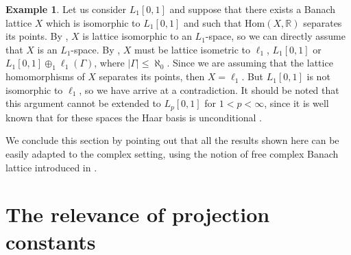 \documentclass[11pt]{amsart}
\theoremstyle{definition}
\newtheorem{example}[thm]{Example}
\numberwithin{equation}{section}
\begin{document}
\begin{example}
 Let us consider $L_1[0,1]$ and suppose that there exists a Banach lattice $X$ which is isomorphic to $L_1[0,1]$ and such that $\text{Hom}(X,\mathbb{R})$ separates its points. By \cite[Proposition 2.1]{dHMST23}, $X$ is lattice isomorphic to an $L_1$-space, so we can directly assume that $X$ is an $L_1$-space. By \cite[Corollary to Theorem 9, Section 14]{Lacey-book}, $X$ must be lattice isometric to $\ell_1$, $L_1[0,1]$ or $L_1[0,1]\oplus_1\ell_1(\Gamma)$, where $|\Gamma|\leq\aleph_0$. Since we are assuming that the lattice homomorphisms of $X$ separates its points, then $X=\ell_1$. But $L_1[0,1]$ is not isomorphic to $\ell_1$, so we have arrive at a contradiction. It should be noted that this argument cannot be extended to $L_p[0,1]$ for $1<p<\infty$, since it is well known that for these spaces the Haar basis is unconditional \cite[Theorem 6.1.7]{AK-book}.
\end{example}



We conclude this section by pointing out that all the results shown here can be easily adapted to the complex setting, using the notion of free complex Banach lattice introduced in \cite{dHT23}. 

\section{The relevance of projection constants}\label{sec:constant}
\end{document}
